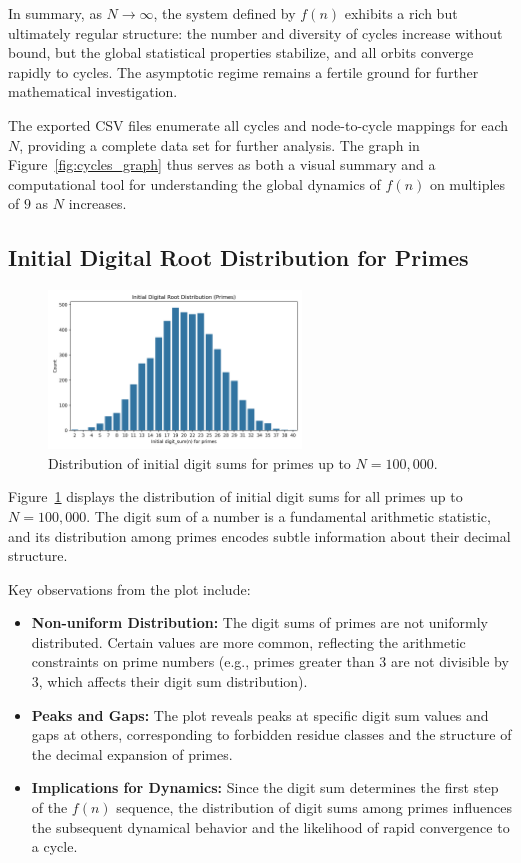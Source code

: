 \documentclass[12pt]{article}
\begin{document}
In summary, as $N \to \infty$, the system defined by $f(n)$ exhibits a rich but ultimately regular structure: the number and diversity of cycles increase without bound, but the global statistical properties stabilize, and all orbits converge rapidly to cycles. The asymptotic regime remains a fertile ground for further mathematical investigation.

The exported CSV files enumerate all cycles and node-to-cycle mappings for each $N$, providing a complete data set for further analysis. The graph in Figure~\ref{fig:cycles_graph} thus serves as both a visual summary and a computational tool for understanding the global dynamics of $f(n)$ on multiples of $9$ as $N$ increases.

\subsection{Initial Digital Root Distribution for Primes}
\begin{figure}[H]
    \centering
    \includegraphics[width=0.6\textwidth]{fig_initial_digit_sum_primes.png}
    \caption{Distribution of initial digit sums for primes up to $N=100,000$.}
    \label{fig:digit_sum_primes}
\end{figure}

Figure~\ref{fig:digit_sum_primes} displays the distribution of initial digit sums for all primes up to $N=100,000$. The digit sum of a number is a fundamental arithmetic statistic, and its distribution among primes encodes subtle information about their decimal structure.

Key observations from the plot include:
\begin{itemize}
    \item \textbf{Non-uniform Distribution:} The digit sums of primes are not uniformly distributed. Certain values are more common, reflecting the arithmetic constraints on prime numbers (e.g., primes greater than $3$ are not divisible by $3$, which affects their digit sum distribution).
    \item \textbf{Peaks and Gaps:} The plot reveals peaks at specific digit sum values and gaps at others, corresponding to forbidden residue classes and the structure of the decimal expansion of primes.
    \item \textbf{Implications for Dynamics:} Since the digit sum determines the first step of the $f(n)$ sequence, the distribution of digit sums among primes influences the subsequent dynamical behavior and the likelihood of rapid convergence to a cycle.
\end{itemize}
\end{document}
